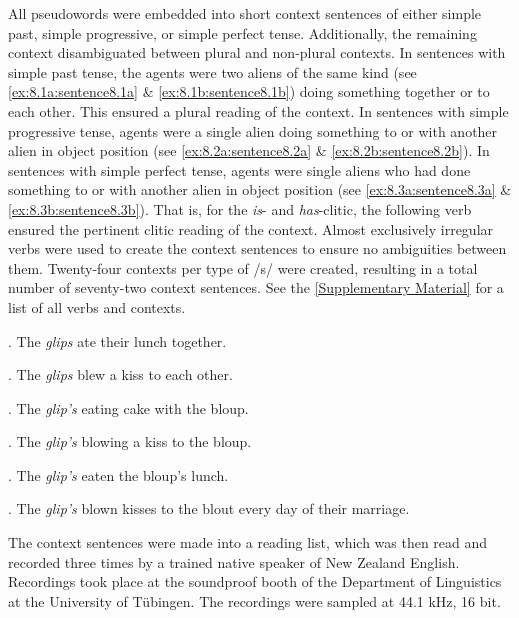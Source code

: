 All pseudowords were embedded into short context sentences of either simple past, simple progressive, or simple perfect tense. Additionally, the remaining context disambiguated between plural and non-plural contexts. In sentences with simple past tense, the agents were two aliens of the same kind (see \ref{ex:8.1a:sentence8.1a} \& \ref{ex:8.1b:sentence8.1b}) doing something together or to each other. This ensured a plural reading of the context. In sentences with simple progressive tense, agents were a single alien doing something to or with another alien in object position (see \ref{ex:8.2a:sentence8.2a} \& \ref{ex:8.2b:sentence8.2b}). In sentences with simple perfect tense, agents were single aliens who had done something to or with another alien in object position (see \ref{ex:8.3a:sentence8.3a} \& \ref{ex:8.3b:sentence8.3b}). That is, for the \textit{is}- and \textit{has}-clitic, the following verb ensured the pertinent clitic reading of the context. Almost exclusively irregular verbs were used to create the context sentences to ensure no ambiguities between them. Twenty-four contexts per type of /s/ were created, resulting in a total number of seventy-two context sentences. See the \ref{Supplementary Material} for a list of all verbs and contexts.

\ex.
\label{ex:8.1a:sentence8.1a}
	The \textit{glips} ate their lunch together.
	
\ex.
\label{ex:8.1b:sentence8.1b}
	The \textit{glips} blew a kiss to each other.

\ex.
\label{ex:8.2a:sentence8.2a}
	The \textit{glip’s} eating cake with the bloup. 

\ex.
\label{ex:8.2b:sentence8.2b}
	The \textit{glip’s} blowing a kiss to the bloup.
	
\ex.
\label{ex:8.3a:sentence8.3a}
    The \textit{glip’s} eaten the bloup’s lunch.
	
\ex.
\label{ex:8.3b:sentence8.3b}
	The \textit{glip’s} blown kisses to the blout every day of their marriage.

The context sentences were made into a reading list, which was then read and recorded three times by a trained native speaker of New Zealand English. Recordings took place at the soundproof booth of the Department of Linguistics at the University of Tübingen. The recordings were sampled at 44.1 kHz, 16 bit.

